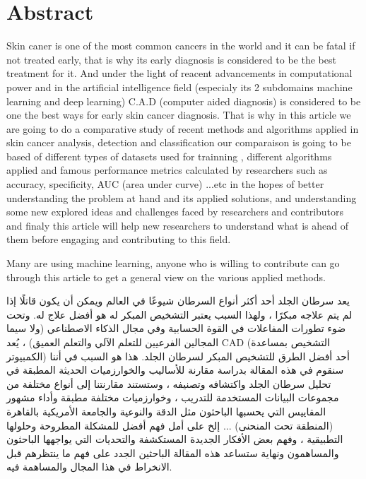 \section*{Abstract}
Skin caner is one of the most common cancers in the world and it can be fatal if not treated early, that is why its early diagnosis is considered to be the best treatment for it. And under the light of reacent advancements in computational power and in the artificial intelligence field (especialy its 2 subdomains machine learning and deep learning) C.A.D (computer aided diagnosis) is considered to be one the best ways for early skin cancer diagnosis. That is why in this article we are going to do a comparative study of recent methods and algorithms applied in skin cancer analysis, detection and classification our comparaison is going to be based of different types of datasets used for trainning , different algorithms applied and famous performance metrics calculated by researchers such as accuracy, specificity, AUC (area under curve) ...etc in the hopes of better understanding the problem at hand and its applied solutions, and understanding some new explored ideas and challenges faced by researchers and contributors and finaly this article will help new researchers to understand what is ahead of them before engaging and contributing to this field.

Many are using machine learning, anyone who is willing to contribute can go through this article to get a general view on the various applied methods.

\begin{center}
\end{center}
\begin{RLtext}

    يعد سرطان الجلد أحد أكثر أنواع السرطان شيوعًا في العالم ويمكن أن يكون قاتلًا إذا لم يتم علاجه مبكرًا ، ولهذا السبب يعتبر التشخيص المبكر له هو أفضل علاج له. وتحت ضوء تطورات المفاعلات في القوة الحسابية وفي مجال الذكاء الاصطناعي (ولا سيما المجالين الفرعيين للتعلم الآلي والتعلم العميق) ، يُعد CAD (التشخيص بمساعدة الكمبيوتر) أحد أفضل الطرق للتشخيص المبكر لسرطان الجلد. هذا هو السبب في أننا سنقوم في هذه المقالة بدراسة مقارنة للأساليب والخوارزميات الحديثة المطبقة في تحليل سرطان الجلد واكتشافه وتصنيفه ، وستستند مقارنتنا إلى أنواع مختلفة من مجموعات البيانات المستخدمة للتدريب ، وخوارزميات مختلفة مطبقة وأداء مشهور المقاييس التي يحسبها الباحثون مثل الدقة والنوعية والجامعة الأمريكية بالقاهرة (المنطقة تحت المنحنى) ... إلخ على أمل فهم أفضل للمشكلة المطروحة وحلولها التطبيقية ، وفهم بعض الأفكار الجديدة المستكشفة والتحديات التي يواجهها الباحثون والمساهمون ونهاية ستساعد هذه المقالة الباحثين الجدد على فهم ما ينتظرهم قبل الانخراط في هذا المجال والمساهمة فيه.


\end{RLtext}



